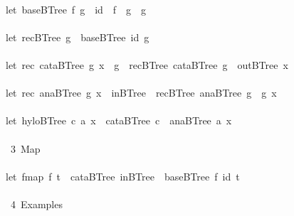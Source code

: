 \documentclass[a4paper]{article}
\begin{document}
\begin{tabbing}
\ttfamily ~\\
\ttfamily ~let~baseBTree~f~g~~id~~f~~g~~g\\
\ttfamily ~\\
\ttfamily ~let~recBTree~g~~baseBTree~id~g\\
\ttfamily ~\\
\ttfamily ~let~rec~cataBTree~g~x~~g~~recBTree~cataBTree~g~~outBTree~x~\\
\ttfamily ~\\
\ttfamily ~let~rec~anaBTree~g~x~~inBTree~~recBTree~anaBTree~g~~g~x\\
\ttfamily ~\\
\ttfamily ~let~hyloBTree~c~a~x~~cataBTree~c~~anaBTree~a~x\\
\ttfamily ~\\
\ttfamily ~~3~Map~\\
\ttfamily ~\\
\ttfamily ~let~fmap~f~t~~cataBTree~inBTree~~baseBTree~f~id~t\\
\ttfamily ~\\
\ttfamily ~~4~Examples~\\

\end{tabbing}
\end{document}
